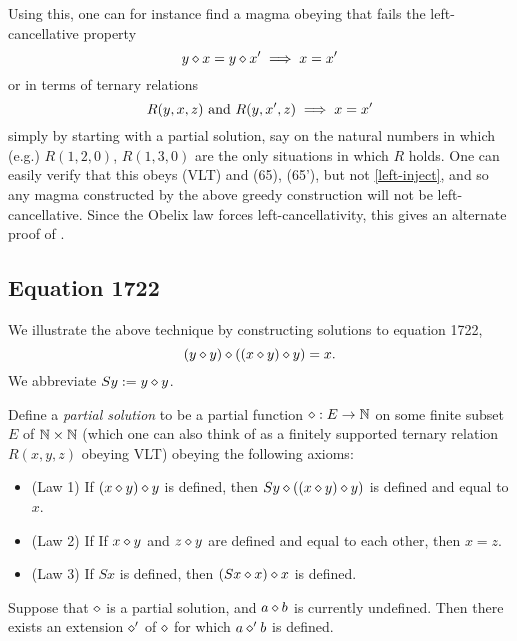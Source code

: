 Using this, one can for instance find a magma obeying  that fails the left-cancellative property
$$ y \diamond x = y \diamond x' \implies x=x'$$
or in terms of ternary relations
\begin{equation}\label{left-inject}
   R(y,x,z) \hbox{ and } R(y,x',z) \implies x=x'
\end{equation}
simply by starting with a partial solution, say on the natural numbers in which (e.g.) $R(1,2,0)$, $R(1,3,0)$ are the only situations in which $R$ holds.  One can easily verify that this obeys (VLT) and (65), (65'), but not \eqref{left-inject}, and so any magma constructed by the above greedy construction will not be left-cancellative.  Since the Obelix law  forces left-cancellativity, this gives an alternate proof of .

\subsection{Equation 1722}

We illustrate the above technique by constructing solutions to equation 1722,
\begin{equation}\label{1722}
  (y \diamond y) \diamond ((x \diamond y) \diamond y) = x.
\end{equation}
We abbreviate $Sy := y \diamond y$.

Define a \emph{partial solution} to be a partial function $\diamond: E \to \mathbb{N}$ on some finite subset $E$ of $\mathbb{N} \times \mathbb{N}$ (which one can also think of as a finitely supported ternary relation $R(x,y,z)$ obeying VLT) obeying the following axioms:
\begin{itemize}
\item (Law 1) If $(x \diamond y) \diamond y$ is defined, then $Sy \diamond ((x \diamond y) \diamond y)$ is defined and equal to $x$.
\item (Law 2) If  If $x \diamond y$ and $z \diamond y$ are defined and equal to each other, then $x=z$.
\item (Law 3) If $Sx$ is defined, then $(Sx \diamond x) \diamond x$ is defined.
\end{itemize}

\begin{lemma}[1722 extension]\label{1722-extension}  Suppose that $\diamond$ is a partial solution, and $a \diamond b$ is currently undefined.  Then there exists an extension $\diamond'$ of $\diamond$ for which $a \diamond' b$ is defined.
\end{lemma}

